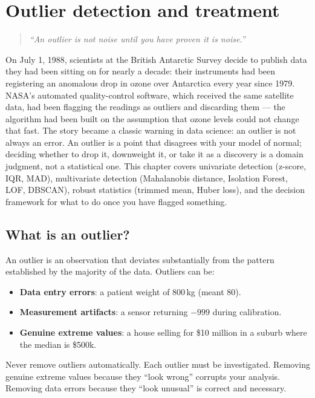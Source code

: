 \chapter{Outlier detection and treatment}
\label{ch:outliers}

\begin{quote}
\emph{``An outlier is not noise until you have proven it is noise.''}
\end{quote}

On July 1, 1988, scientists at the British Antarctic Survey decide to publish data they had been sitting on for nearly a decade: their instruments had been registering an anomalous drop in ozone over Antarctica every year since 1979. NASA's automated quality-control software, which received the same satellite data, had been flagging the readings as outliers and discarding them --- the algorithm had been built on the assumption that ozone levels could not change that fast. The story became a classic warning in data science: an outlier is not always an error. An outlier is a point that disagrees with your model of normal; deciding whether to drop it, downweight it, or take it as a discovery is a domain judgment, not a statistical one. This chapter covers univariate detection (z-score, IQR, MAD), multivariate detection (Mahalanobis distance, Isolation Forest, LOF, DBSCAN), robust statistics (trimmed mean, Huber loss), and the decision framework for what to do once you have flagged something.

\section{What is an outlier?}

An outlier is an observation that deviates substantially from the pattern established by the majority of the data. Outliers can be:

\begin{itemize}
  \item \textbf{Data entry errors}: a patient weight of 800\,kg (meant 80).
  \item \textbf{Measurement artifacts}: a sensor returning $-999$ during calibration.
  \item \textbf{Genuine extreme values}: a house selling for \$10 million in a suburb where the median is \$500k.
\end{itemize}

\begin{warningbox}
Never remove outliers automatically. Each outlier must be investigated. Removing genuine extreme values because they ``look wrong'' corrupts your analysis. Removing data errors because they ``look unusual'' is correct and necessary.
\end{warningbox}

